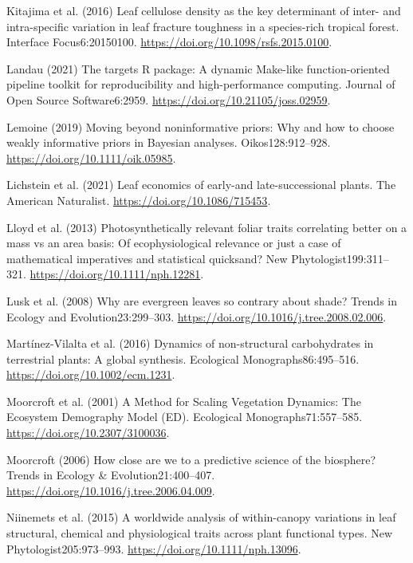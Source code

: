 \documentclass[
  12pt,
  letterpaper,
  DIV=11,
  numbers=noendperiod]{scrartcl}
\newlength{\cslhangindent}
\newenvironment{CSLReferences}[2] %
 {\begin{list}{}{%
  \setlength{\itemindent}{0pt}
  \setlength{\leftmargin}{0pt}
  \setlength{\parsep}{0pt}
  \ifodd #1
   \setlength{\leftmargin}{\cslhangindent}
   \setlength{\itemindent}{-1\cslhangindent}
  \fi
  \setlength{\itemsep}{#2\baselineskip}}}
 {\end{list}}
\begin{document}
\begin{CSLReferences}{1}{1}
Kitajima et al. (2016) Leaf cellulose density as the key determinant of
inter- and intra-specific variation in leaf fracture toughness in a
species-rich tropical forest. Interface Focus6:20150100.
\url{https://doi.org/10.1098/rsfs.2015.0100}.

Landau (2021) The targets {R} package: A dynamic {Make-like}
function-oriented pipeline toolkit for reproducibility and
high-performance computing. Journal of Open Source Software6:2959.
\url{https://doi.org/10.21105/joss.02959}.

Lemoine (2019) Moving beyond noninformative priors: Why and how to
choose weakly informative priors in {Bayesian} analyses.
Oikos128:912--928. \url{https://doi.org/10.1111/oik.05985}.

Lichstein et al. (2021) Leaf economics of early-and late-successional
plants. The American Naturalist. \url{https://doi.org/10.1086/715453}.

Lloyd et al. (2013) Photosynthetically relevant foliar traits
correlating better on a mass vs an area basis: {Of} ecophysiological
relevance or just a case of mathematical imperatives and statistical
quicksand? New Phytologist199:311--321.
\url{https://doi.org/10.1111/nph.12281}.

Lusk et al. (2008) Why are evergreen leaves so contrary about shade?
Trends in Ecology and Evolution23:299--303.
\url{https://doi.org/10.1016/j.tree.2008.02.006}.

Martínez-Vilalta et al. (2016) Dynamics of non-structural carbohydrates
in terrestrial plants: A global synthesis. Ecological
Monographs86:495--516. \url{https://doi.org/10.1002/ecm.1231}.

Moorcroft et al. (2001) A {Method} for {Scaling Vegetation Dynamics}:
{The Ecosystem Demography Model} ({ED}). Ecological
Monographs71:557--585. \url{https://doi.org/10.2307/3100036}.

Moorcroft (2006) How close are we to a predictive science of the
biosphere? Trends in Ecology \& Evolution21:400--407.
\url{https://doi.org/10.1016/j.tree.2006.04.009}.

Niinemets et al. (2015) A worldwide analysis of within-canopy variations
in leaf structural, chemical and physiological traits across plant
functional types. New Phytologist205:973--993.
\url{https://doi.org/10.1111/nph.13096}.


\end{CSLReferences}
\end{document}
